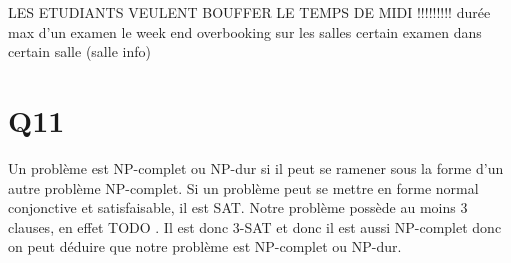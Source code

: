 \documentclass[a4paper,11pt]{article}
\begin{document}
LES ETUDIANTS VEULENT BOUFFER LE TEMPS DE MIDI !!!!!!!!!
durée max d'un examen
le week end
overbooking sur les salles
certain examen dans certain salle (salle info)


\section{Q11}
Un problème est NP-complet ou NP-dur si il peut se ramener sous la forme d'un autre problème NP-complet. Si un problème peut se mettre en forme normal conjonctive et satisfaisable, il est SAT. Notre problème possède au moins 3 clauses, en effet TODO . Il est donc 3-SAT et donc il est aussi NP-complet donc on peut déduire que notre problème est NP-complet ou NP-dur.
\end{document}
